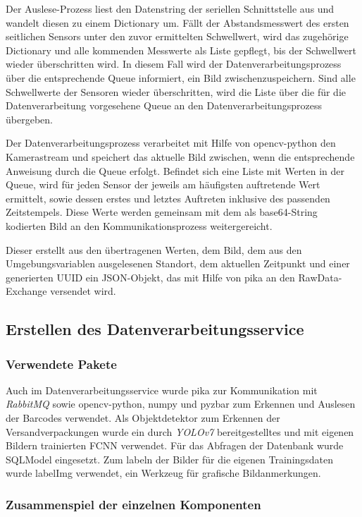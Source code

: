 Der Auslese-Prozess liest den Datenstring der seriellen Schnittstelle aus und wandelt diesen zu einem Dictionary um. Fällt der Abstandsmesswert des ersten seitlichen Sensors unter den zuvor ermittelten Schwellwert, wird das zugehörige Dictionary und alle kommenden Messwerte als Liste gepflegt, bis der Schwellwert wieder überschritten wird. In diesem Fall wird der Datenverarbeitungsprozess über die entsprechende Queue informiert, ein Bild zwischenzuspeichern. Sind alle Schwellwerte der Sensoren wieder überschritten, wird die Liste über die für die Datenverarbeitung vorgesehene Queue an den Datenverarbeitungsprozess übergeben.

Der Datenverarbeitungsprozess verarbeitet mit Hilfe von opencv-python den Kamerastream und speichert das aktuelle Bild zwischen, wenn die entsprechende Anweisung durch die Queue erfolgt. Befindet sich eine Liste mit Werten in der Queue, wird für jeden Sensor der jeweils am häufigsten auftretende Wert ermittelt, sowie dessen erstes und letztes Auftreten inklusive des passenden Zeitstempels. Diese Werte werden gemeinsam mit dem als base64-String kodierten Bild an den Kommunikationsprozess weitergereicht.

Dieser erstellt aus den übertragenen Werten, dem Bild, dem aus den Umgebungsvariablen ausgelesenen Standort, dem aktuellen Zeitpunkt und einer generierten \ac{UUID} ein JSON-Objekt, das mit Hilfe von pika an den RawData-Exchange versendet wird.


\subsection{Erstellen des Datenverarbeitungsservice}


\subsubsection{Verwendete Pakete}

Auch im Datenverarbeitungsservice wurde pika zur Kommunikation mit \textit{\gls{RabbitMQ}} sowie opencv-python, numpy und pyzbar zum Erkennen und Auslesen der Barcodes verwendet. Als Objektdetektor zum Erkennen der Versandverpackungen wurde ein durch \textit{\gls{YOLOv7}} bereitgestelltes und mit eigenen Bildern trainierten \ac{FCNN} verwendet. Für das Abfragen der Datenbank wurde SQLModel eingesetzt. Zum labeln der Bilder für die eigenen Trainingsdaten wurde labelImg verwendet, ein Werkzeug für grafische Bildanmerkungen. \autocite{labelimg}


\subsubsection{Zusammenspiel der einzelnen Komponenten}

